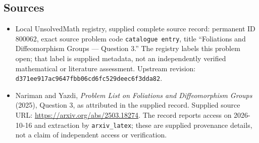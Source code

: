 \documentclass[11pt]{article}
\begin{document}
\subsection{Sources}
\begin{itemize}
\item Local UnsolvedMath registry, supplied complete source record: permanent ID \(800062\), exact source problem code \texttt{catalogue entry}, title ``Foliations and Diffeomorphism Groups --- Question 3.'' The registry labels this problem open; that label is supplied metadata, not an independently verified mathematical or literature assessment. Upstream revision: \texttt{d371ee917ac9647fbb06cd6fc529deec6f3dda82}.
\item Nariman and Yazdi, \emph{Problem List on Foliations and Diffeomorphism Groups} (2025), Question 3, as attributed in the supplied record. Supplied source URL: \url{https://arxiv.org/abs/2503.18274}. The record reports access on 2026-10-16 and extraction by \texttt{arxiv\_latex}; these are supplied provenance details, not a claim of independent access or verification.
\end{itemize}
\end{document}
